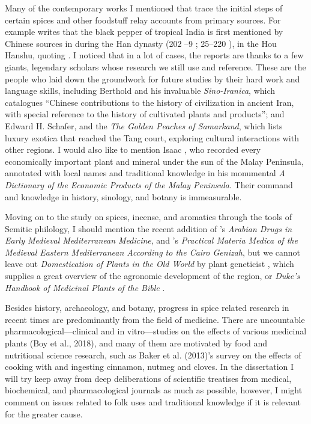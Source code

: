 
Many of the contemporary works I mentioned that trace the initial steps of certain spices and other foodstuff relay accounts from primary sources. For example \textcite{spengler_spices_2019} writes that the black pepper of tropical India is first mentioned by Chinese sources in during the Han dynasty (202 \BC{}--9 \AD{}; 25--220 \AD{}), in the \gls{Hou Hanshu}, quoting \textcite[374]{laufer_sino-iranica_1919}. I noticed that in a lot of cases, the reports are thanks to a few giants, legendary scholars whose research we still use and reference. These are the people who laid down the groundwork for future studies by their hard work and language skills, including Berthold \textcite{Laufer} and his invaluable \textit{Sino-Iranica}, which catalogues ``Chinese contributions to the history of civilization in ancient Iran, with special reference to the history of cultivated plants and products''; and Edward H. Schafer, and the \textit{The Golden Peaches of Samarkand}, which lists luxury exotica that reached the Tang court, exploring cultural interactions with other regions. I would also like to mention Isaac \textcite{burkill_dictionary_1935}, who recorded every economically important plant and mineral under the sun of the Malay Peninsula, annotated with local names and traditional knowledge in his monumental \textit{A Dictionary of the Economic Products of the Malay Peninsula}. Their command and knowledge in history, sinology, and botany is immeasurable.

Moving on to the study on spices, incense, and aromatics through the tools of Semitic philology, I should mention the recent addition of \textcite{amar_arabian_2017}'s \textit{Arabian Drugs in Early Medieval Mediterranean Medicine}, and \textcite{lev_practical_2008}'s \textit{Practical Materia Medica of the Medieval Eastern Mediterranean According to the Cairo Genizah}, but we cannot leave out \textit{Domestication of Plants in the Old World} by plant geneticist \textcite{zohary_domestication_2012}, which supplies a great overview of the agronomic development of the region, or \textit{Duke's Handbook of Medicinal Plants of the Bible} \autocite{duke_dukes_2008}.

Besides history, archaeology, and botany, progress in spice related research in recent times are predominantly from the field of medicine. There are uncountable pharmacological---clinical and in vitro---studies on the effects of various medicinal plants (Boy et al., 2018), and many of them are motivated by food and nutritional science research, such as Baker et al. (2013)’s survey on the effects of cooking with and ingesting cinnamon, nutmeg and cloves. In the dissertation I will try keep away from deep deliberations of scientific treatises from medical, biochemical, and pharmacological journals as much as possible, however, I might  comment on issues related to folk uses and traditional knowledge if it is relevant for the greater cause.

